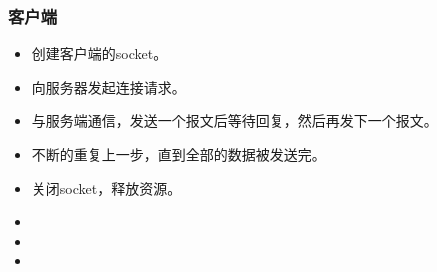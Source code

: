 \documentclass[UTF8]{article}%
\begin{document}
\subsubsection{客户端}

\begin{itemize}
    \item 创建客户端的socket。
    \item 向服务器发起连接请求。
    \item 与服务端通信，发送一个报文后等待回复，然后再发下一个报文。
    \item 不断的重复上一步，直到全部的数据被发送完。
    \item 关闭socket，释放资源。
\end{itemize}









\begin{itemize}
    \item 
    \item 
    \item 
\end{itemize}
\end{document}

